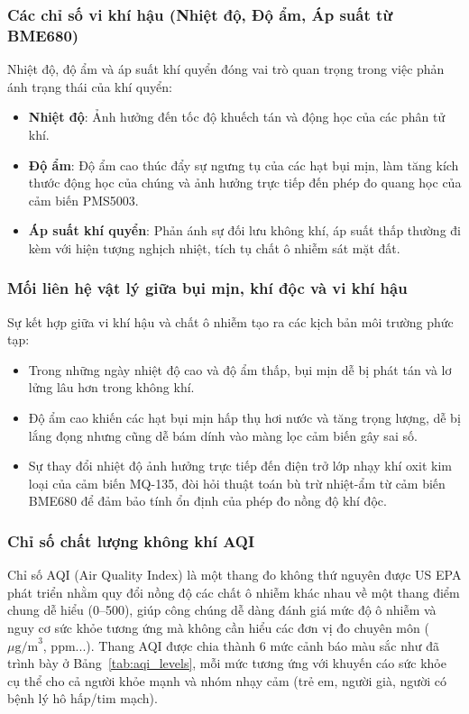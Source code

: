 \documentclass[12pt,a4paper]{article}
\begin{document}
\subsubsection{Các chỉ số vi khí hậu (Nhiệt độ, Độ ẩm, Áp suất từ BME680)}
Nhiệt độ, độ ẩm và áp suất khí quyển đóng vai trò quan trọng trong việc phản ánh trạng thái của khí quyển:
\begin{itemize}
    \item \textbf{Nhiệt độ}: Ảnh hưởng đến tốc độ khuếch tán và động học của các phân tử khí.
    \item \textbf{Độ ẩm}: Độ ẩm cao thúc đẩy sự ngưng tụ của các hạt bụi mịn, làm tăng kích thước động học của chúng và ảnh hưởng trực tiếp đến phép đo quang học của cảm biến PMS5003.
    \item \textbf{Áp suất khí quyển}: Phản ánh sự đối lưu không khí, áp suất thấp thường đi kèm với hiện tượng nghịch nhiệt, tích tụ chất ô nhiễm sát mặt đất.
\end{itemize}

\subsubsection{Mối liên hệ vật lý giữa bụi mịn, khí độc và vi khí hậu}
Sự kết hợp giữa vi khí hậu và chất ô nhiễm tạo ra các kịch bản môi trường phức tạp:
\begin{itemize}
    \item Trong những ngày nhiệt độ cao và độ ẩm thấp, bụi mịn dễ bị phát tán và lơ lửng lâu hơn trong không khí.
    \item Độ ẩm cao khiến các hạt bụi mịn hấp thụ hơi nước và tăng trọng lượng, dễ bị lắng đọng nhưng cũng dễ bám dính vào màng lọc cảm biến gây sai số.
    \item Sự thay đổi nhiệt độ ảnh hưởng trực tiếp đến điện trở lớp nhạy khí oxit kim loại của cảm biến MQ-135, đòi hỏi thuật toán bù trừ nhiệt-ẩm từ cảm biến BME680 để đảm bảo tính ổn định của phép đo nồng độ khí độc.
\end{itemize}

\subsubsection{Chỉ số chất lượng không khí AQI}
Chỉ số AQI (Air Quality Index) là một thang đo không thứ nguyên được US EPA phát triển nhằm quy đổi nồng độ các chất ô nhiễm khác nhau về một thang điểm chung dễ hiểu (0--500), giúp công chúng dễ dàng đánh giá mức độ ô nhiễm và nguy cơ sức khỏe tương ứng mà không cần hiểu các đơn vị đo chuyên môn ($\mu\text{g/m}^3$, ppm...). Thang AQI được chia thành 6 mức cảnh báo màu sắc như đã trình bày ở Bảng~\ref{tab:aqi_levels}, mỗi mức tương ứng với khuyến cáo sức khỏe cụ thể cho cả người khỏe mạnh và nhóm nhạy cảm (trẻ em, người già, người có bệnh lý hô hấp/tim mạch).
\end{document}
